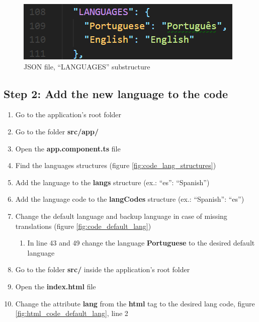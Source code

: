 \begin{figure}[ht]
    \centering
    \includegraphics{lib/images/translate/languages_substructure.png}
    \caption{JSON file, ``LANGUAGES'' substructure}
    \label{fig:languages_substructure}
\end{figure}

\subsection{Step 2: Add the new language to the code}

\begin{enumerate}
    \item Go to the application's root folder
    \item Go to the folder \textbf{src/app/}
    \item Open the \textbf{app.component.ts} file
    \item Find the languages structures (figure \ref{fig:code_lang_structures})
    \item Add the language to the \textbf{langs} structure (ex.: ``es'': ``Spanish'')
    \item Add the language code to the \textbf{langCodes} structure (ex.: ``Spanish'': ``es'')
    \item Change the default language and backup language in case of missing translations (figure \ref{fig:code_default_lang})
    \begin{enumerate}
        \item In line 43 and 49 change the language \textbf{Portuguese} to the desired default language
    \end{enumerate}
    \item Go to the folder \textbf{src/} inside the application's root folder
    \item Open the \textbf{index.html} file
    \item Change the attribute \textbf{lang} from the \textbf{html} tag to the desired lang code, figure \ref{fig:html_code_default_lang}, line 2
\end{enumerate}

